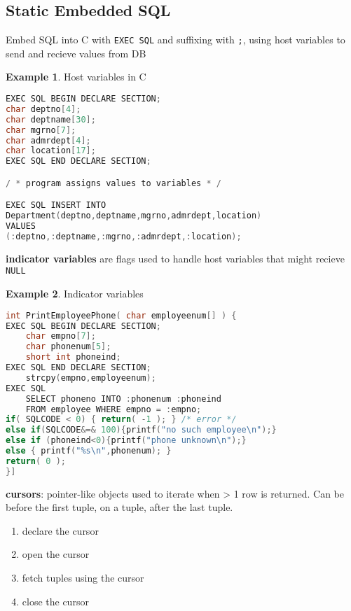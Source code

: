 \documentclass[]{article}
\theoremstyle{definition}
\newtheorem{ex}{Example}[section]
\begin{document}
		\subsection{Static Embedded SQL}		
			Embed SQL into C with \lstinline|EXEC SQL| and suffixing with \lstinline|;|, using host variables to send and recieve values from DB
			\begin{ex}
				Host variables in C
				\begin{lstlisting}[language=C]
EXEC SQL BEGIN DECLARE SECTION;
char deptno[4];
char deptname[30];
char mgrno[7];
char admrdept[4];
char location[17];
EXEC SQL END DECLARE SECTION;

/ * program assigns values to variables * /

EXEC SQL INSERT INTO
Department(deptno,deptname,mgrno,admrdept,location)
VALUES
(:deptno,:deptname,:mgrno,:admrdept,:location);
				\end{lstlisting}
			\end{ex}
			\textbf{indicator variables} are flags used to handle host variables that might recieve \lstinline|NULL|
			\begin{ex}
				Indicator variables
				\begin{lstlisting}[language=C]
int PrintEmployeePhone( char employeenum[] ) {
EXEC SQL BEGIN DECLARE SECTION;
	char empno[7];
	char phonenum[5];
	short int phoneind;
EXEC SQL END DECLARE SECTION;
	strcpy(empno,employeenum);
EXEC SQL
	SELECT phoneno INTO :phonenum :phoneind
	FROM employee WHERE empno = :empno;
if( SQLCODE < 0) { return( -1 ); } /* error */
else if(SQLCODE&=& 100){printf("no such employee\n");}
else if (phoneind<0){printf("phone unknown\n");}
else { printf("%s\n",phonenum); } 
return( 0 );
}]
				\end{lstlisting}
			\end{ex}
			\textbf{cursors}: pointer-like objects used to iterate when > 1 row is returned. Can be before the first tuple, on a tuple, after the last tuple.
			\begin{enumerate}
				\item declare the cursor
				\item open the cursor
				\item fetch tuples using the cursor
				\item close the cursor
			\end{enumerate}
\end{document}

